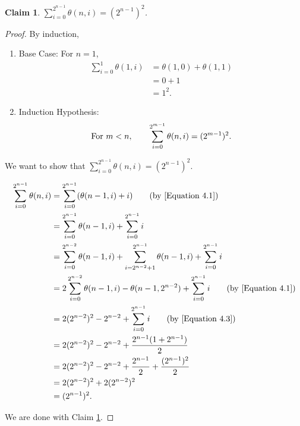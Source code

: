 \documentclass[12pt]{ucthesis}
\theoremstyle{plain}
\newtheorem{claim}{Claim}
\theoremstyle{definition}
\begin{document}
\begin{claim}
\label{Claim 4}
$\sum_{i = 0}^{2^{n - 1}} \theta(n, i) = (2^{n - 1})^2$.
\end{claim}
\begin{proof}
By induction,
\begin{enumerate}[(1)]
\item Base Case: For $n = 1$,
	\begin{align*}
	\sum_{i = 0}^1 \theta(1, i)
	& = \theta(1, 0) + \theta(1, 1) \\
	& = 0 + 1 \\
	& = 1^2.
	\end{align*}
\item Induction Hypothesis:
	\begin{equation}
	\label{Equation 4.3}
	\textnormal{For } m < n, \qquad
	\sum_{i = 0}^{2^{m - 1}} \theta(n, i) = (2^{m - 1})^2.
	\end{equation}
\end{enumerate}

We want to show that $\sum_{i = 0}^{2^{n - 1}} \theta(n, i) = (2^{n - 1})^2$.

\begin{align*}
\sum_{i = 0}^{2^{n - 1}} \theta(n, i)
& = \sum_{i = 0}^{2^{n - 1}} (\theta(n - 1, i) + i) \tag{by \ref{Equation 4.1}} \\
& = \sum_{i = 0}^{2^{n - 1}} \theta(n - 1, i) + \sum_{i = 0}^{2^{n - 1}} i \\
& = \sum_{i = 0}^{2^{n - 2}} \theta(n - 1, i) +
    \sum_{i = 2^{n - 2} + 1}^{2^{n - 1}} \theta(n - 1, i) + \sum_{i = 0}^{2^{n - 1}} i \\
& = 2 \sum_{i = 0}^{2^{n - 2}} \theta(n - 1, i) - \theta(n - 1, 2^{n - 2}) +
    \sum_{i = 0}^{2^{n - 1}} i \tag{by \ref{Equation 4.1}} \\
& = 2 (2^{n - 2})^2 - 2^{n - 2} + \sum_{i = 0}^{2^{n - 1}} i \tag{by \ref{Equation 4.3}} \\
& = 2 (2^{n - 2})^2 - 2^{n - 2} + \frac{2^{n - 1}(1 + 2^{n - 1})}{2} \\
& = 2 (2^{n - 2})^2 - 2^{n - 2} + \frac{2^{n - 1}}{2} + \frac{(2^{n - 1})^2}{2} \\
& = 2 (2^{n - 2})^2 + 2 (2^{n - 2})^2 \\
& = (2^{n - 1})^2.
\end{align*}

We are done with Claim \ref{Claim 4}.
\end{proof}
\end{document}
